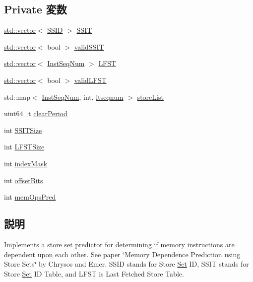 \subsection*{Private 変数}
\begin{DoxyCompactItemize}
\item 
\hyperlink{classstd_1_1vector}{std::vector}$<$ \hyperlink{classStoreSet_a3cffbd955ca25d7d74d98168c6ea2404}{SSID} $>$ \hyperlink{classStoreSet_a5c8ed73b9517db1737e7164d1db20154}{SSIT}
\item 
\hyperlink{classstd_1_1vector}{std::vector}$<$ bool $>$ \hyperlink{classStoreSet_ae026c336a6a2761ace6e098304dda75f}{validSSIT}
\item 
\hyperlink{classstd_1_1vector}{std::vector}$<$ \hyperlink{inst__seq_8hh_a258d93d98edaedee089435c19ea2ea2e}{InstSeqNum} $>$ \hyperlink{classStoreSet_a8f418b57f9abc868817afd8026effc89}{LFST}
\item 
\hyperlink{classstd_1_1vector}{std::vector}$<$ bool $>$ \hyperlink{classStoreSet_aa0bec890135b0b249993f12f80634c07}{validLFST}
\item 
std::map$<$ \hyperlink{inst__seq_8hh_a258d93d98edaedee089435c19ea2ea2e}{InstSeqNum}, int, \hyperlink{structltseqnum}{ltseqnum} $>$ \hyperlink{classStoreSet_a641f6adef35ba24d36e194842e0650b2}{storeList}
\item 
uint64\_\-t \hyperlink{classStoreSet_a9ae4231099a7cc00dcbf234aa174af44}{clearPeriod}
\item 
int \hyperlink{classStoreSet_acd4dabf4d426240afbd79129f8484945}{SSITSize}
\item 
int \hyperlink{classStoreSet_a8ff9a6f977f155a663ce56418b68e9cd}{LFSTSize}
\item 
int \hyperlink{classStoreSet_a33e6f6648561ce74ee753dd190356fd0}{indexMask}
\item 
int \hyperlink{classStoreSet_a44788461daa83a3b9b3da3fd39d54f31}{offsetBits}
\item 
int \hyperlink{classStoreSet_aa51123e118112a84b5139b216be38d8f}{memOpsPred}
\end{DoxyCompactItemize}


\subsection{説明}
Implements a store set predictor for determining if memory instructions are dependent upon each other. See paper \char`\"{}Memory
 Dependence Prediction using Store Sets\char`\"{} by Chrysos and Emer. SSID stands for Store \hyperlink{classSet}{Set} ID, SSIT stands for Store \hyperlink{classSet}{Set} ID Table, and LFST is Last Fetched Store Table. 

